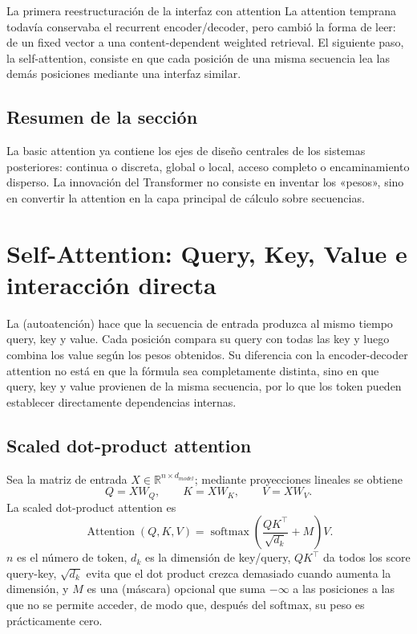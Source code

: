 \documentclass[a4paper]{article}
\begin{document}
\begin{importantbox}{La primera reestructuración de la interfaz con attention}
La attention temprana todavía conservaba el recurrent encoder/decoder, pero cambió la forma de leer: de un fixed vector a una content-dependent weighted retrieval. El siguiente paso, la self-attention, consiste en que cada posición de una misma secuencia lea las demás posiciones mediante una interfaz similar.
\end{importantbox}

\subsection{Resumen de la sección}

La basic attention ya contiene los ejes de diseño centrales de los sistemas posteriores: continua o discreta, global o local, acceso completo o encaminamiento disperso. La innovación del Transformer no consiste en inventar los «pesos», sino en convertir la attention en la capa principal de cálculo sobre secuencias.
\section{Self-Attention: Query, Key, Value e interacción directa}

La  (autoatención) hace que la secuencia de entrada produzca al mismo tiempo query, key y value. Cada posición compara su query con todas las key y luego combina los value según los pesos obtenidos. Su diferencia con la encoder-decoder attention no está en que la fórmula sea completamente distinta, sino en que query, key y value provienen de la misma secuencia, por lo que los token pueden establecer directamente dependencias internas.

\subsection{Scaled dot-product attention}

Sea la matriz de entrada $X\in\mathbb{R}^{n\times d_{model}}$; mediante proyecciones lineales se obtiene
\[
Q=XW_Q,\qquad K=XW_K,\qquad V=XW_V.
\]
La scaled dot-product attention es
\[
\operatorname{Attention}(Q,K,V)
=\operatorname{softmax}\!\left(\frac{QK^\top}{\sqrt{d_k}}+M\right)V.
\]
$n$ es el número de token, $d_k$ es la dimensión de key/query, $QK^\top$ da todos los score query-key, $\sqrt{d_k}$ evita que el dot product crezca demasiado cuando aumenta la dimensión, y $M$ es una  (máscara) opcional que suma $-\infty$ a las posiciones a las que no se permite acceder, de modo que, después del softmax, su peso es prácticamente cero.
\end{document}
